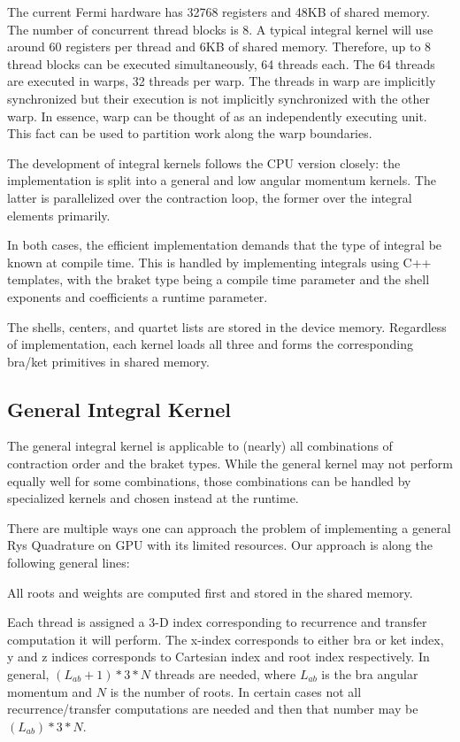 \documentclass[12pt]{article}
\begin{document}
The current Fermi hardware has 32768 registers and 48KB of shared
memory.  The number of concurrent thread blocks is 8.  A typical
integral kernel will use around 60 registers per thread and 6KB of
shared memory. Therefore, up to 8 thread blocks can be executed
simultaneously, 64 threads each.  The 64 threads are executed in
warps, 32 threads per warp.  The threads in warp are implicitly
synchronized but their execution is not implicitly synchronized with
the other warp.  In essence, warp can be thought of as an
independently executing unit. This fact can be used to partition
work along the warp boundaries.

The development of integral kernels follows the CPU version closely:
the implementation is split into a general and low angular momentum
kernels.  The latter is parallelized over the contraction loop, the
former over the integral elements primarily.

In both cases, the efficient implementation demands that the type of
integral be known at compile time.  This is handled by implementing
integrals using C++ templates, with the braket type being a compile
time parameter and the shell exponents and coefficients a runtime parameter.

The shells, centers, and quartet lists are stored in the device
memory.  Regardless of implementation, each kernel loads all three and
forms the corresponding bra/ket primitives in shared memory.

\subsection*{General Integral Kernel}
The general integral kernel is applicable to (nearly) all combinations
of contraction order and the braket types.  While the general kernel
may not perform equally well for some combinations, those combinations
can be handled by specialized kernels and chosen instead at the
runtime.

There are multiple ways one can approach the problem of
implementing a general Rys Quadrature on GPU with its limited
resources.  Our approach is along the following general lines:

All roots and weights are computed first and stored in the shared
memory.

Each thread is assigned a 3-D index corresponding to recurrence and
transfer computation it will perform.  The x-index corresponds to
either bra or ket index, y and z indices corresponds to Cartesian
index and root index respectively.  In general, $(L_{ab}+1)*3*N$
threads are needed, where $L_{ab}$ is the bra angular momentum and $N$
is the number of roots.  In certain cases not all recurrence/transfer
computations are needed and then that number may be $(L_{ab})*3*N$.
\end{document}

